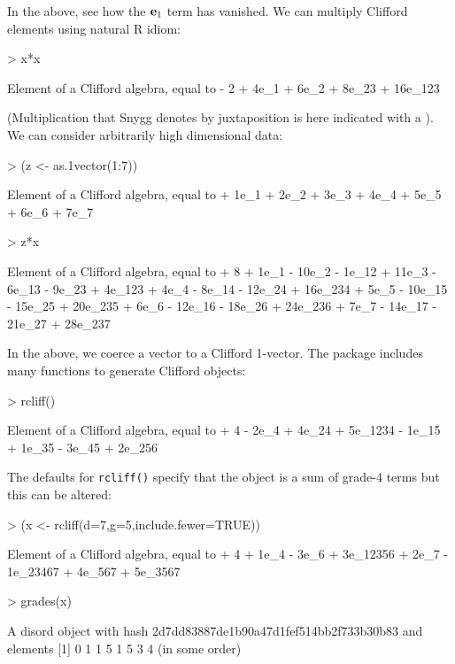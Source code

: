\documentclass{article}
\begin{document}
In the above, see how the ${\bf e}_{1}$ term has vanished.  We can
multiply Clifford elements using natural R idiom:

\begin{Schunk}
\begin{Sinput}
> x*x
\end{Sinput}
\begin{Soutput}
Element of a Clifford algebra, equal to
- 2 + 4e_1 + 6e_2 + 8e_23 + 16e_123
\end{Soutput}
\end{Schunk}

(Multiplication that Snygg denotes by juxtaposition is here indicated
with a {\tt *}).  We can consider arbitrarily high dimensional data:

\begin{Schunk}
\begin{Sinput}
> (z <- as.1vector(1:7))
\end{Sinput}
\begin{Soutput}
Element of a Clifford algebra, equal to
+ 1e_1 + 2e_2 + 3e_3 + 4e_4 + 5e_5 + 6e_6 + 7e_7
\end{Soutput}
\begin{Sinput}
> z*x
\end{Sinput}
\begin{Soutput}
Element of a Clifford algebra, equal to
+ 8 + 1e_1 - 10e_2 - 1e_12 + 11e_3 - 6e_13 - 9e_23 + 4e_123 + 4e_4 - 8e_14 -
12e_24 + 16e_234 + 5e_5 - 10e_15 - 15e_25 + 20e_235 + 6e_6 - 12e_16 - 18e_26 +
24e_236 + 7e_7 - 14e_17 - 21e_27 + 28e_237
\end{Soutput}
\end{Schunk}

In the above, we coerce a vector to a Clifford 1-vector.  The package
includes many functions to generate Clifford objects:

\begin{Schunk}
\begin{Sinput}
> rcliff()
\end{Sinput}
\begin{Soutput}
Element of a Clifford algebra, equal to
+ 4 - 2e_4 + 4e_24 + 5e_1234 - 1e_15 + 1e_35 - 3e_45 + 2e_256
\end{Soutput}
\end{Schunk}

The defaults for {\tt rcliff()} specify that the object is a sum of
grade-4 terms but this can be altered:

\begin{Schunk}
\begin{Sinput}
> (x <- rcliff(d=7,g=5,include.fewer=TRUE))
\end{Sinput}
\begin{Soutput}
Element of a Clifford algebra, equal to
+ 4 + 1e_4 - 3e_6 + 3e_12356 + 2e_7 - 1e_23467 + 4e_567 + 5e_3567
\end{Soutput}
\begin{Sinput}
> grades(x)
\end{Sinput}
\begin{Soutput}
A disord object with hash 2d7dd83887de1b90a47d1fef514bb2f733b30b83 and elements
[1] 0 1 1 5 1 5 3 4
(in some order)
\end{Soutput}
\end{Schunk}
\end{document}
